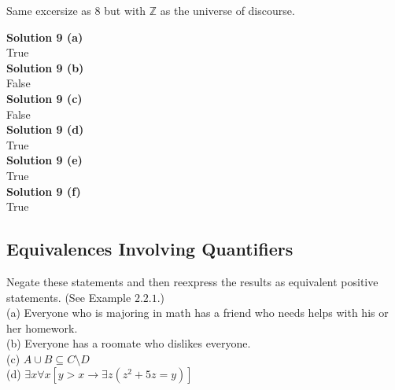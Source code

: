 \begin{tcolorbox}[title=Problem 10, breakable]
Same excersize as $8$ but with $\mathbb{Z}$ as the universe of discourse.
\end{tcolorbox}

\textbf{Solution 9 (a)} \\
True \\
\textbf{Solution 9 (b)} \\
False \\
\textbf{Solution 9 (c)} \\
False \\
\textbf{Solution 9 (d)} \\
True \\
\textbf{Solution 9 (e)} \\
True \\
\textbf{Solution 9 (f)} \\
True

\subsection{Equivalences Involving Quantifiers}

\begin{tcolorbox}[title=Problem 1, breakable]
    Negate these statements and then reexpress the results as equivalent positive statements.
    (See Example $2.2.1$.) \\
    (a) Everyone who is majoring in math has a friend who needs helps with his or her homework. \\
    (b) Everyone has a roomate who dislikes everyone. \\
    (c) $A \cup B \subseteq C \setminus D$ \\
    (d) $\exists{x}\forall{x}[y > x \rightarrow \exists{z}(z^2 + 5z = y)]$
\end{tcolorbox}

